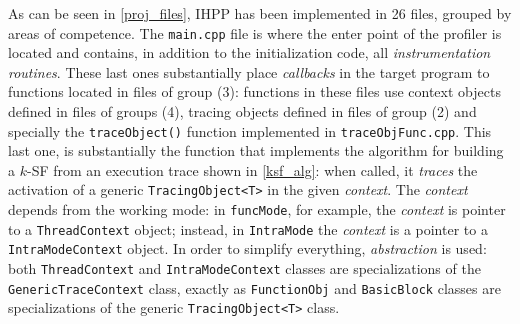 \documentclass[a4paper,10pt]{report}
\begin{document}
As can be seen in \cref{proj_files}, IHPP has been implemented in 26 files,
grouped by areas of competence. The \verb|main.cpp| file is where the enter point
 of the profiler is located and contains, in addition to the initialization code, all \emph{instrumentation routines}. These last ones substantially place \emph{callbacks}
in the target program to functions located in files of group (3): functions in these
files use context objects defined in files of groups (4), 
tracing objects defined in files of group (2) and specially
the \verb|traceObject()| function implemented in \verb|traceObjFunc.cpp|.
This last one, is substantially the function that implements the algorithm for building
a $k$-SF from an execution trace shown in \cref{ksf_alg}: 
when called, it \emph{traces} the activation of a generic \verb|TracingObject<T>| 
in the given \emph{context}. The \emph{context} depends from the working mode:
in \verb|funcMode|, for example, the \emph{context} is pointer to a \verb|ThreadContext| object; instead, in \verb|IntraMode| the \emph{context} is 
a pointer to a \verb|IntraModeContext| object. In order to simplify everything, 
\emph{abstraction} is used: 
both \verb|ThreadContext| and \verb|IntraModeContext| classes
are specializations of
the \verb|GenericTraceContext| class, exactly as \verb|FunctionObj| and 
\verb|BasicBlock| classes are specializations of the generic \verb|TracingObject<T>| class.
\end{document}
